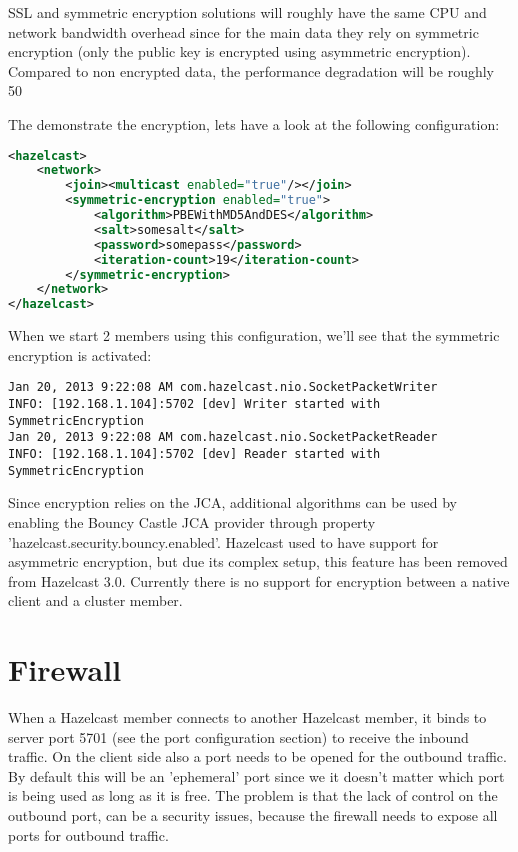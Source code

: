 SSL and symmetric encryption solutions will roughly have the same CPU and network bandwidth overhead since for the main data  they rely on symmetric encryption (only the public key is encrypted using asymmetric encryption). Compared to non encrypted data, the performance degradation will be roughly 50%

The demonstrate the encryption, lets have a look at the following configuration:
\begin{lstlisting}[language=xml]
<hazelcast>
    <network>
        <join><multicast enabled="true"/></join>
        <symmetric-encryption enabled="true">
            <algorithm>PBEWithMD5AndDES</algorithm>
            <salt>somesalt</salt>
            <password>somepass</password>
            <iteration-count>19</iteration-count>
        </symmetric-encryption>
    </network>
</hazelcast>
\end{lstlisting}
When we start 2 members using this configuration, we'll see that the symmetric encryption is activated:
\begin{lstlisting}
Jan 20, 2013 9:22:08 AM com.hazelcast.nio.SocketPacketWriter
INFO: [192.168.1.104]:5702 [dev] Writer started with SymmetricEncryption
Jan 20, 2013 9:22:08 AM com.hazelcast.nio.SocketPacketReader
INFO: [192.168.1.104]:5702 [dev] Reader started with SymmetricEncryption
\end{lstlisting}

Since encryption relies on the JCA, additional algorithms can be used by enabling the Bouncy Castle JCA provider through property 'hazelcast.security.bouncy.enabled'. Hazelcast used to have support for asymmetric encryption, but due its complex setup, this feature has been removed from Hazelcast 3.0. Currently there is no support for encryption between a native client and a cluster member.

\section{Firewall}
When a Hazelcast member connects to another Hazelcast member, it binds to server port 5701 (see the port configuration section) to receive the inbound traffic. On the client side also a port needs to be opened for the outbound traffic. By default this will be an 'ephemeral' port since we it doesn't matter which port is being used as long as it is free. The problem is that the lack of control on the outbound port, can be a security issues, because the firewall needs to expose all ports for outbound traffic. 

